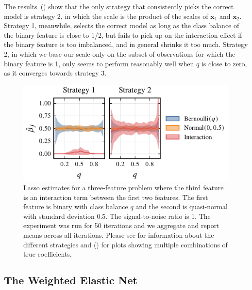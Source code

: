 The results~() show that the only strategy that consistently picks
the correct model is strategy 2, in which the scale is the product of the scales of
\(\bm{x}_1\) and \(\bm{x}_2\). Strategy 1, meanwhile, selects the correct model as long as
the class balance of the binary feature is close to 1/2, but fails to pick up on the
interaction effect if the binary feature is too imbalanced, and in general shrinks it too
much. Strategy 2, in which we base our scale only on the subset of observations for which
the binary feature is 1, only seems to perform reasonably well when \(q\) is close to zero,
as it converges towards strategy 3.

\begin{figure}[htpb]
  \centering
  \includegraphics[]{plots/interactions-classbalance-small.pdf}
  \caption{%
    Lasso estimates for a three-feature problem where the third feature is an
    interaction term between the first two features. The first feature is
    binary with class balance \(q\) and the second is quasi-normal with
    standard deviation 0.5. The signal-to-noise ratio is 1. The experiment was
    run for 50 iterations and we aggregate and report means across all
    iterations. Please see  for information
    about the different strategies and 
    () for plots showing multiple
    combinations of true coefficients.
  }
  \label{fig:interactions}
\end{figure}

\subsection{The Weighted Elastic Net}\label{sec:experiments-elasticnet}

